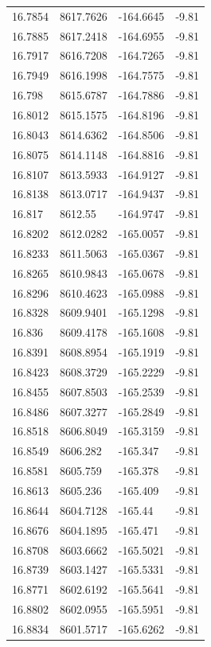 \begin{table}[H]
\begin{tabular}{llll}
16.7854 & 8617.7626 & -164.6645 & -9.81 \\
16.7885 & 8617.2418 & -164.6955 & -9.81 \\
16.7917 & 8616.7208 & -164.7265 & -9.81 \\
16.7949 & 8616.1998 & -164.7575 & -9.81 \\
16.798 & 8615.6787 & -164.7886 & -9.81 \\
16.8012 & 8615.1575 & -164.8196 & -9.81 \\
16.8043 & 8614.6362 & -164.8506 & -9.81 \\
16.8075 & 8614.1148 & -164.8816 & -9.81 \\
16.8107 & 8613.5933 & -164.9127 & -9.81 \\
16.8138 & 8613.0717 & -164.9437 & -9.81 \\
16.817 & 8612.55 & -164.9747 & -9.81 \\
16.8202 & 8612.0282 & -165.0057 & -9.81 \\
16.8233 & 8611.5063 & -165.0367 & -9.81 \\
16.8265 & 8610.9843 & -165.0678 & -9.81 \\
16.8296 & 8610.4623 & -165.0988 & -9.81 \\
16.8328 & 8609.9401 & -165.1298 & -9.81 \\
16.836 & 8609.4178 & -165.1608 & -9.81 \\
16.8391 & 8608.8954 & -165.1919 & -9.81 \\
16.8423 & 8608.3729 & -165.2229 & -9.81 \\
16.8455 & 8607.8503 & -165.2539 & -9.81 \\
16.8486 & 8607.3277 & -165.2849 & -9.81 \\
16.8518 & 8606.8049 & -165.3159 & -9.81 \\
16.8549 & 8606.282 & -165.347 & -9.81 \\
16.8581 & 8605.759 & -165.378 & -9.81 \\
16.8613 & 8605.236 & -165.409 & -9.81 \\
16.8644 & 8604.7128 & -165.44 & -9.81 \\
16.8676 & 8604.1895 & -165.471 & -9.81 \\
16.8708 & 8603.6662 & -165.5021 & -9.81 \\
16.8739 & 8603.1427 & -165.5331 & -9.81 \\
16.8771 & 8602.6192 & -165.5641 & -9.81 \\
16.8802 & 8602.0955 & -165.5951 & -9.81 \\
16.8834 & 8601.5717 & -165.6262 & -9.81 \\

\end{tabular}
\end{table}
